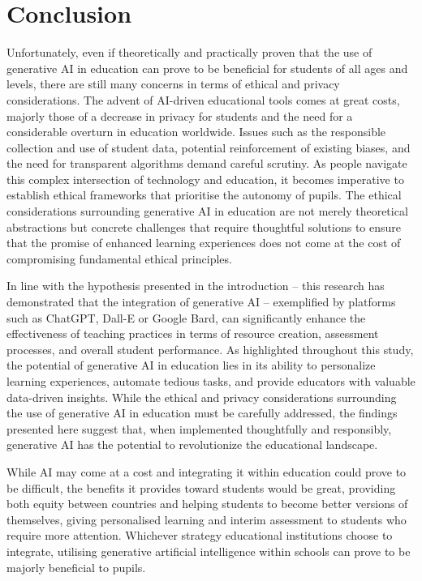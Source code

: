 \documentclass[a4paper,12pt]{report}
\begin{document}
\section{Conclusion} \label{sect:conclusion}
\hspace{10mm} Unfortunately, even if theoretically and practically proven that the use of generative AI in education can prove to be beneficial for students of all ages and levels, there are still many concerns in terms of ethical and privacy considerations. The advent of AI-driven educational tools comes at great costs, majorly those of a decrease in privacy for students and the need for a considerable overturn in education worldwide. Issues such as the responsible collection and use of student data, potential reinforcement of existing biases, and the need for transparent algorithms demand careful scrutiny. As people navigate this complex intersection of technology and education, it becomes imperative to establish ethical frameworks that prioritise the autonomy of pupils. The ethical considerations surrounding generative AI in education are not merely theoretical abstractions but concrete challenges that require thoughtful solutions to ensure that the promise of enhanced learning experiences does not come at the cost of compromising fundamental ethical principles.

In line with the hypothesis presented in the introduction -- this research has demonstrated that the integration of generative AI -- exemplified by platforms such as ChatGPT, Dall-E or Google Bard, can significantly enhance the effectiveness of teaching practices in terms of resource creation, assessment processes, and overall student performance. As highlighted throughout this study, the potential of generative AI in education lies in its ability to personalize learning experiences, automate tedious tasks, and provide educators with valuable data-driven insights. While the ethical and privacy considerations surrounding the use of generative AI in education must be carefully addressed, the findings presented here suggest that, when implemented thoughtfully and responsibly, generative AI has the potential to revolutionize the educational landscape.

While AI may come at a cost and integrating it within education could prove to be difficult, the benefits it provides toward students would be great, providing both equity between countries and helping students to become better versions of themselves, giving personalised learning and interim assessment to students who require more attention. Whichever strategy educational institutions choose to integrate, utilising generative artificial intelligence within schools can prove to be majorly beneficial to pupils.
\end{document}
